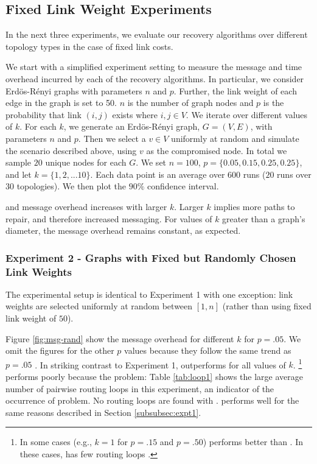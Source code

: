 \subsection{Fixed Link Weight Experiments}
\label{subsec:fixed}

In the next three experiments, we evaluate our recovery algorithms over different topology types in the case of fixed link costs.

We start with a simplified experiment setting to measure the 
 message and time overhead incurred by each of the recovery
 algorithms. In particular, we consider 
Erd\"{o}s-R\'enyi graphs with parameters $n$ and $p$. Further, the
link weight of each edge in the graph is set to 50.
$n$ is the number of graph nodes and $p$ is the probability that link $(i,j)$ exists where $i,j \in V$. We iterate over different values of $k$. For each $k$, we 
generate an Erd\"{o}s-R\'enyi graph, $G = (V,E)$, with parameters $n$ and $p$. Then we select a $v \in V$ uniformly at random and simulate the scenario described above, 
using $v$ as the compromised node. In total we sample $20$ unique nodes for each $G$.
We set $n=100$, $p=\{0.05,0.15,0.25, 0.25\}$, and let $k=\{1,2,
... 10\}$. Each data point is an average over $600$ runs ($20$ runs over 
$30$ topologies).  We then plot the $90 \%$ confidence interval.




\purge and \second message overhead increases with larger $k$. Larger $k$ implies more paths to repair, and therefore increased messaging.
For values of $k$ greater than a graph's diameter, the message overhead remains constant, as expected. 


\subsubsection{Experiment 2 - \er Graphs with Fixed but Randomly Chosen Link Weights}
\label{subsec:expt2}


The experimental setup is identical to Experiment 1 with one exception: link weights are selected uniformly at random between $[1,n]$ (rather than using 
fixed link weight of $50$).

Figure \ref{fig:msg-rand} show the message overhead for different $k$ for $p=.05$. We omit the figures for the other $p$ values because they follow the 
same trend as $p=.05$ \cite{Tech}.
In striking contrast to Experiment 1, \purge outperforms \second for all values of $k$. 
{\footnote {\small In some cases (e.g., $k=1$ for $p=.15$ and $p=.50$) \second performs better than \purges.  In these cases, \second has few routing loops \cite{Tech}.
}}
\second performs poorly because the \infinity problem: Table \ref{tab:loop1} shows the large average number of pairwise routing loops in this experiment, 
an indicator of the occurrence of \infinity problem.
No routing loops are found with \purges. \cpr performs well for the same reasons described in Section \ref{subsubsec:expt1}.  




